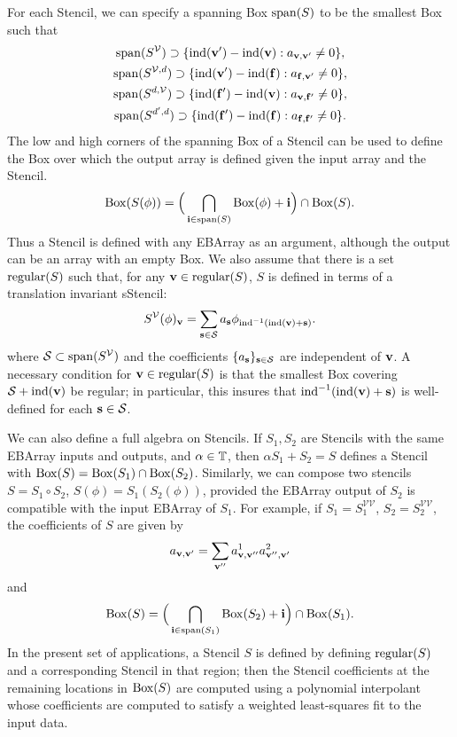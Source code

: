 \documentclass[12pt]{article}
\newcommand{\mcl}[1]{{\mathcal{#1}}}
\newcommand{\ind}{{\rm{ind}}}
\newcommand{\regular}{{\rm{regular}}}
\newcommand{\spanEB}{{\rm{span}}}
\newcommand{\MBox}{{\rm{Box}}}
\newcommand{\vof}{{\mbf{v}}}
\newcommand{\face}{{\mbf{f}}}
\begin{document}
\noindent
For each Stencil, we can specify a spanning Box $\spanEB(S)$ to be the smallest Box such that 
\begin{gather*}
\spanEB(S^\mcl{V}) \supset \{\ind(\vof') - \ind(\vof):a_{\vof,\vof'} \neq 0\} , \\
\spanEB(S^{\mcl{V},d}) \supset \{\ind(\vof') - \ind(\face):a_{\face,\vof'} \neq 0\}, \\
\spanEB(S^{d,\mcl{V}}) \supset \{\ind(\face') - \ind(\vof):a_{\vof,\face'} \neq 0\} , \\
\spanEB(S^{d',d}) \supset \{\ind(\face') - \ind(\face):a_{\face,\face'} \neq 0\}.
\end{gather*}
The low and high corners of the spanning Box of a Stencil can be used to define the Box over which the output array is defined given the input array and the Stencil. 
\begin{gather*}
\MBox(S(\phi)) = \Big(\bigcap \limits_{\mbf{i} \in \spanEB(S)} \MBox(\phi) + \mbf{i} \Big) \cap \MBox(S).
\end{gather*}
Thus a Stencil is defined with any EBArray as an argument, although the output can be an array with an empty Box. 
We also assume that there is a set $\regular(S)$ such that, for any $\vof \in \regular(S)$,  $S$ is defined in terms of a translation invariant  sStencil: 
\begin{gather*}
S^{\mcl{V}} (\phi)_\vof = \sum \limits_{\mbf{s} \in \mcl{S}} a_{\mbf{s}} \phi_{\ind^{-1}(\ind(\vof) + \mbf{s})}.
\end{gather*}
where $\mcl{S} \subset \spanEB(S^\mcl{V})$ and the coefficients $\{a_\mbf{s}\}_{\mbf{s} \in \mcl{S}}$ are independent of $\vof$. A necessary condition for $\vof \in \regular(S)$ is that the smallest Box covering $\mcl{S} + \ind(\vof)$ be regular; in particular, this insures that $\ind^{-1}(\ind(\vof) + \mbf{s})$ is well-defined for each $\mbf{s} \in \mcl{S}$. 

We can also define a full algebra on Stencils. If $S_1,S_2$ are Stencils with the same EBArray inputs and outputs, and $\alpha \in \mathbb{T}$, then
$\alpha S_1 + S_2= S$ defines a Stencil with $\MBox(S) = \MBox(S_1) \cap \MBox(S_2)$. Similarly, we can compose two stencils
$S = S_1 \circ S_2$, $S(\phi) = S_1(S_2(\phi))$, provided the EBArray output of $S_2$ is compatible with the input EBArray of $S_1$. For example, if $S_1 = S_1^{\mcl{V}\mcl{V}}$, 
$S_2 = S_2^{\mcl{V}\mcl{V}}$, the coefficients of $S$ are given by
\begin{gather*}
a_{\vof,\vof'} = \sum \limits_{\vof ''} a_{\vof,\vof''}^1 a_{\vof'',\vof'}^2
\end{gather*}
and 
\begin{gather*}
\MBox(S) = \Big(\bigcap \limits_{\mbf{i} \in \spanEB(S_1)} \MBox(S_2) + \mbf{i} \Big) \cap \MBox(S_1).
\end{gather*}
In the present set of applications, a Stencil $S$ is defined by defining $\regular(S)$ and a corresponding  Stencil in that region; then the Stencil coefficients at the remaining locations in $\MBox(S)$ are computed using a polynomial interpolant whose coefficients are computed to satisfy a weighted least-squares fit to the input data. 
\end{document}
